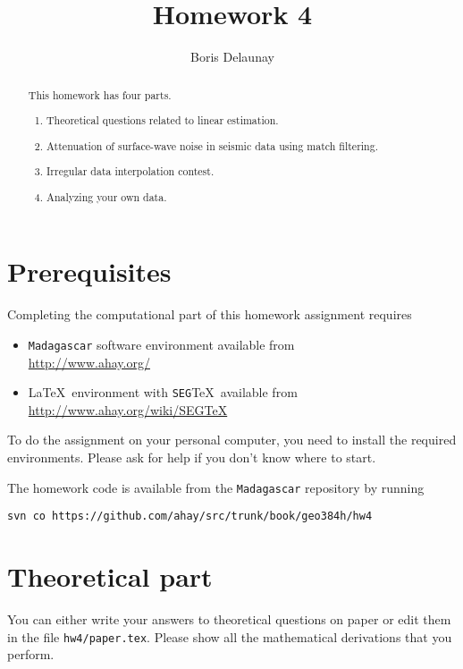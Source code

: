 \author{Boris Delaunay}
\title{Homework 4}

\begin{abstract}
  This homework has four parts. 
  \begin{enumerate}
  \item Theoretical questions related to linear estimation.
  \item Attenuation of surface-wave noise in 
        seismic data using match filtering.
  \item Irregular data interpolation contest.
  \item Analyzing your own data.
  \end{enumerate}
\end{abstract}

\section{Prerequisites}

Completing the computational part of this homework assignment requires
\begin{itemize}
\item \texttt{Madagascar} software environment available from \\
\url{http://www.ahay.org/}
\item \LaTeX\ environment with \texttt{SEG}\TeX\ available from \\ 
\url{http://www.ahay.org/wiki/SEGTeX}
\end{itemize}
To do the assignment on your personal computer, you need to install
the required environments. Please ask for help if you don't know where
to start.

The homework code is available from the \texttt{Madagascar} repository
by running
\begin{verbatim}
svn co https://github.com/ahay/src/trunk/book/geo384h/hw4
\end{verbatim}

\section{Theoretical part}

You can either write your answers to theoretical questions on paper or
edit them in the file \texttt{hw4/paper.tex}. Please show all the
mathematical derivations that you perform.

